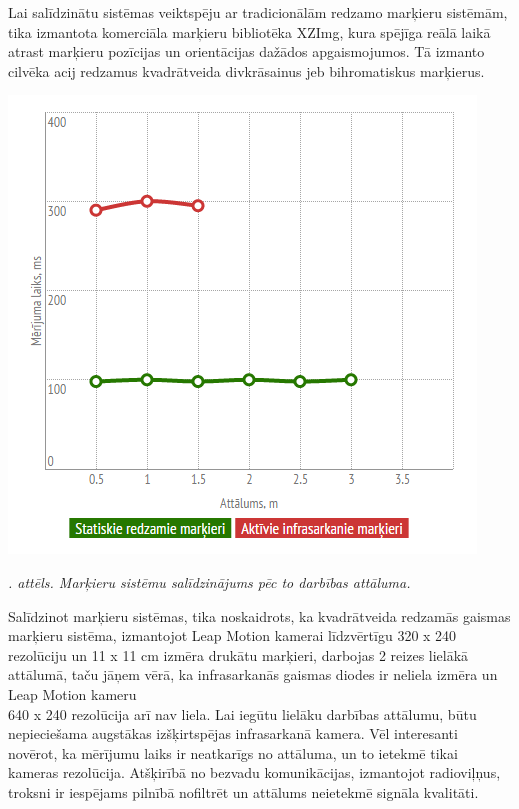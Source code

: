 \documentclass[12pt, a4paper, oneside, openright]{article}
\renewcommand{\thecimages}{\arabic{cimages}}
\begin{document}

Lai salīdzinātu sistēmas veiktspēju ar tradicionālām redzamo marķieru sistēmām, tika izmantota komerciāla
marķieru bibliotēka XZImg, kura spējīga reālā laikā atrast marķieru pozīcijas un orientācijas dažādos apgaismojumos.
Tā izmanto cilvēka acij redzamus kvadrātveida divkrāsainus jeb bihromatiskus marķierus. 

\label{cimages:merijumi_distance.png}
\vspace{10pt}
\begin{samepage}
\begin{center}
\includegraphics[width=0.7\columnwidth]{images/merijumi_distance.png}
\begin{center}
\footnotesize{
\textit{\thecimages. attēls. Marķieru sistēmu salīdzinājums pēc to darbības attāluma.}}
\end{center}
\end{center}
\end{samepage}

Salīdzinot marķieru sistēmas, tika noskaidrots, ka kvadrātveida redzamās gaismas marķieru sistēma, izmantojot Leap Motion
kamerai līdzvērtīgu 320 x 240 rezolūciju un 11 x 11 cm izmēra drukātu marķieri, darbojas 2 reizes lielākā attālumā,
taču jāņem vērā, ka infrasarkanās gaismas diodes ir neliela izmēra un Leap Motion kameru \\ 640 x 240 rezolūcija arī nav liela. 
Lai iegūtu lielāku darbības attālumu, būtu nepieciešama augstākas izšķirtspējas infrasarkanā kamera.
Vēl interesanti novērot, ka mērījumu laiks ir neatkarīgs no attāluma, un to ietekmē tikai kameras rezolūcija.
Atšķirībā no bezvadu komunikācijas, izmantojot radioviļņus, troksni ir iespējams pilnībā nofiltrēt un attālums
neietekmē signāla kvalitāti.
\end{document}
